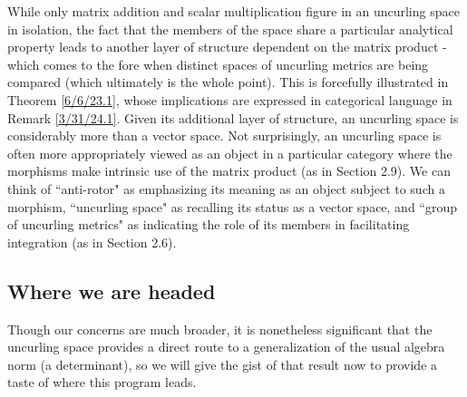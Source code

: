 \documentclass{amsart}
\numberwithin{equation}{section}
\theoremstyle{definition}
\numberwithin{theorem}{section}
\begin{document}
While only matrix addition and scalar multiplication figure in an uncurling space in isolation, the fact that the members of the space share a particular analytical property leads to another layer of structure dependent on the matrix product - which comes to the fore when distinct spaces of uncurling metrics are being compared (which ultimately is the whole point).  This is forcefully illustrated in Theorem \ref{6/6/23.1}, whose implications are expressed in categorical language in Remark \ref{3/31/24.1}. Given its additional layer of structure, an uncurling space is considerably more than a vector space.  Not surprisingly, an uncurling space is often more appropriately viewed as an object in a particular category where the morphisms make intrinsic use of the matrix product (as in Section 2.9).    
We can think of  ``anti-rotor" as emphasizing its meaning as an object subject to such a morphism, ``uncurling space" as recalling its status as a vector space, and ``group of uncurling metrics" as indicating the role of its members in facilitating integration (as in Section 2.6).
 
 
  \subsection{Where we are headed}
    Though our concerns are much broader, it is nonetheless significant that the uncurling space provides a direct route to a generalization of the usual algebra norm (a determinant), so we will give the gist of that result now to provide a taste of where this program leads.  
 
\end{document}
